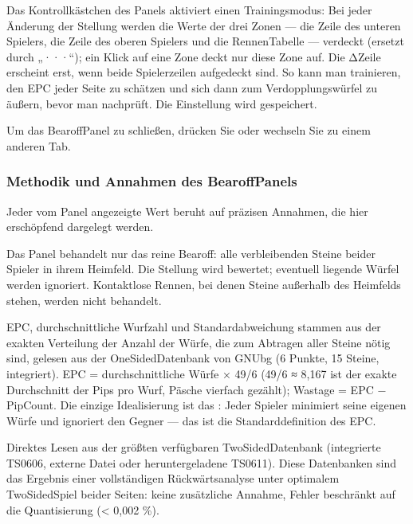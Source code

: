 \documentclass[letterpaper,10pt,german]{sphinxmanual}
\begin{document}
\sphinxAtStartPar
{} Das Kontrollkästchen  des Panels aktiviert einen Trainingsmodus: Bei jeder Änderung der Stellung werden die Werte der drei Zonen — die Zeile des unteren Spielers, die Zeile des oberen Spielers und die Rennen\sphinxhyphen{}Tabelle — verdeckt (ersetzt durch „···“); ein Klick auf eine Zone deckt nur diese Zone auf. Die Δ\sphinxhyphen{}Zeile erscheint erst, wenn beide Spielerzeilen aufgedeckt sind. So kann man trainieren, den EPC jeder Seite zu schätzen und sich dann zum Verdopplungswürfel zu äußern, bevor man nachprüft. Die Einstellung wird gespeichert.

\sphinxAtStartPar
Um das Bearoff\sphinxhyphen{}Panel zu schließen, drücken Sie  oder wechseln Sie zu einem anderen Tab.


\subsubsection{Methodik und Annahmen des Bearoff\sphinxhyphen{}Panels}
\label{\detokenize{manuel:methodologie-et-hypotheses-du-panneau-bearoff}}\label{\detokenize{manuel:epc-methodologie}}
\sphinxAtStartPar
Jeder vom Panel angezeigte Wert beruht auf präzisen Annahmen, die hier erschöpfend dargelegt werden.

\sphinxAtStartPar
{} Das Panel behandelt nur das reine Bearoff: alle verbleibenden Steine beider Spieler in ihrem Heimfeld. Die Stellung wird  bewertet; eventuell liegende Würfel werden ignoriert. Kontaktlose Rennen, bei denen Steine außerhalb des Heimfelds stehen, werden nicht behandelt.

\sphinxAtStartPar
{} EPC, durchschnittliche Wurfzahl und Standardabweichung stammen aus der exakten Verteilung der Anzahl der Würfe, die zum Abtragen aller Steine nötig sind, gelesen aus der One\sphinxhyphen{}Sided\sphinxhyphen{}Datenbank von GNUbg (6 Punkte, 15 Steine, integriert). EPC = durchschnittliche Würfe × 49/6 (49/6 ≈ 8,167 ist der exakte Durchschnitt der Pips pro Wurf, Päsche vierfach gezählt); Wastage = EPC − Pip\sphinxhyphen{}Count. Die einzige Idealisierung ist das : Jeder Spieler minimiert seine eigenen Würfe und ignoriert den Gegner — das ist die Standarddefinition des EPC.

\sphinxAtStartPar
{} Direktes Lesen aus der größten verfügbaren Two\sphinxhyphen{}Sided\sphinxhyphen{}Datenbank (integrierte TS\sphinxhyphen{}06\sphinxhyphen{}06, externe Datei oder heruntergeladene TS\sphinxhyphen{}06\sphinxhyphen{}11). Diese Datenbanken sind das Ergebnis einer vollständigen Rückwärtsanalyse unter optimalem Two\sphinxhyphen{}Sided\sphinxhyphen{}Spiel beider Seiten: keine zusätzliche Annahme, Fehler beschränkt auf die Quantisierung (< 0,002 \%).
\end{document}
